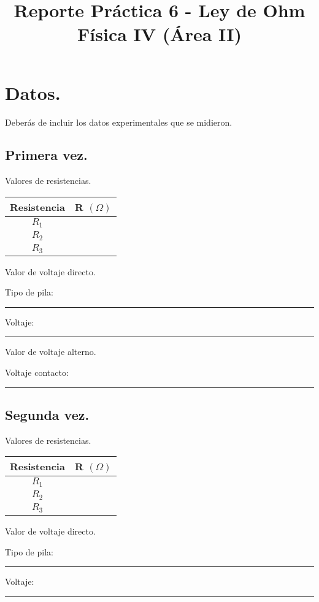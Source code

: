 \documentclass[14pt]{extarticle}
\title{\vspace*{-2cm} Reporte Práctica 6 - Ley de Ohm\\  Física IV (Área II) \vspace{-5ex}}
\date{}
\begin{document}
\maketitle

\section{Datos.}

Deberás de incluir los datos experimentales que se midieron.

\subsection{Primera vez.}

Valores de resistencias.
\begin{table}[H]
\centering
\begin{tabular}{| c | c | } \hline
Resistencia & R $(\Omega)$ \\ \hline
$R_{1}$ & \\ \hline
$R_{2}$ & \\ \hline
$R_{3}$ & \\ \hline
\end{tabular}
\end{table}

Valor de voltaje directo.

Tipo de pila: \rule{2cm}{0.1mm} Voltaje: \rule{2cm}{0.1mm}

Valor de voltaje alterno.

Voltaje contacto: \rule{2cm}{0.1mm}

\subsection{Segunda vez.}

Valores de resistencias.
\begin{table}[H]
\centering
\begin{tabular}{| c | c | } \hline
Resistencia & R $(\Omega)$ \\ \hline
$R_{1}$ & \\ \hline
$R_{2}$ & \\ \hline
$R_{3}$ & \\ \hline
\end{tabular}
\end{table}

Valor de voltaje directo.

Tipo de pila: \rule{2cm}{0.1mm} Voltaje: \rule{2cm}{0.1mm}
\end{document}
